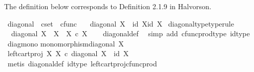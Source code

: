 \begin{isabellebody}
\isamarkupfalse%
%
\endisatagproof
{\isafoldproof}%
%
\isadelimproof
%
\endisadelimproof
%
\isadelimdocument
%
\endisadelimdocument
%
\isatagdocument
%
\isamarkuptrue%
%
\endisatagdocument
{\isafolddocument}%
%
\isadelimdocument
%
\endisadelimdocument
%
\begin{isamarkuptext}%
The definition below corresponds to Definition 2.1.9 in Halvorson.%
\end{isamarkuptext}\isamarkuptrue%
\isamarkupfalse%
\ diagonal\ {\isacharcolon}{\kern0pt}{\isacharcolon}{\kern0pt}\ {\isachardoublequoteopen}cset\ {\isasymRightarrow}\ cfunc{\isachardoublequoteclose}\ \isanewline
\ \ {\isachardoublequoteopen}diagonal\ X\ {\isacharequal}{\kern0pt}\ {\isasymlangle}id\ X{\isacharcomma}{\kern0pt}id\ X{\isasymrangle}{\isachardoublequoteclose}\isanewline
\isanewline
{}\isamarkupfalse%
\ diagonal{\isacharunderscore}{\kern0pt}type{\isacharbrackleft}{\kern0pt}type{\isacharunderscore}{\kern0pt}rule{\isacharbrackright}{\kern0pt}{\isacharcolon}{\kern0pt}\isanewline
\ \ {\isachardoublequoteopen}diagonal\ X\ {\isacharcolon}{\kern0pt}\ X\ {\isasymrightarrow}\ X\ {\isasymtimes}\isactrlsub c\ X{\isachardoublequoteclose}\isanewline
%
\isadelimproof
\ \ %
\endisadelimproof
%
\isatagproof
{}\isamarkupfalse%
\ diagonal{\isacharunderscore}{\kern0pt}def\ \isamarkupfalse%
\ {\isacharparenleft}{\kern0pt}simp\ add{\isacharcolon}{\kern0pt}\ cfunc{\isacharunderscore}{\kern0pt}prod{\isacharunderscore}{\kern0pt}type\ id{\isacharunderscore}{\kern0pt}type{\isacharparenright}{\kern0pt}%
\endisatagproof
{\isafoldproof}%
%
\isadelimproof
\isanewline
%
\endisadelimproof
\isanewline
{}\isamarkupfalse%
\ diag{\isacharunderscore}{\kern0pt}mono{\isacharcolon}{\kern0pt}\isanewline
{\isachardoublequoteopen}monomorphism{\isacharparenleft}{\kern0pt}diagonal\ X{\isacharparenright}{\kern0pt}{\isachardoublequoteclose}\isanewline
%
\isadelimproof
%
\endisadelimproof
%
\isatagproof
{}\isamarkupfalse%
\ {\isacharminus}{\kern0pt}\ \isanewline
\ \ \isamarkupfalse%
\ {\isachardoublequoteopen}left{\isacharunderscore}{\kern0pt}cart{\isacharunderscore}{\kern0pt}proj\ X\ X\ {\isasymcirc}\isactrlsub c\ diagonal\ X\ {\isacharequal}{\kern0pt}\ id\ X{\isachardoublequoteclose}\isanewline
\ \ \ \ \isamarkupfalse%
\ {\isacharparenleft}{\kern0pt}metis\ diagonal{\isacharunderscore}{\kern0pt}def\ id{\isacharunderscore}{\kern0pt}type\ left{\isacharunderscore}{\kern0pt}cart{\isacharunderscore}{\kern0pt}proj{\isacharunderscore}{\kern0pt}cfunc{\isacharunderscore}{\kern0pt}prod{\isacharparenright}{\kern0pt}\isanewline

\end{isabellebody}
